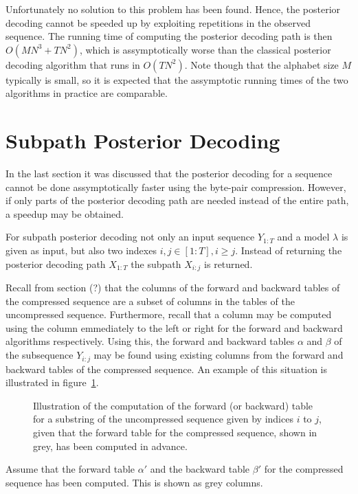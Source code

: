 Unfortunately no solution to this problem has been found. Hence, the posterior
decoding cannot be speeded up by exploiting repetitions in the observed
sequence. The running time of computing the posterior decoding path is then
$O(M N^3 + TN^2)$, which is assymptotically worse than the classical posterior
decoding algorithm that runs in $O(TN^2)$. Note though that the alphabet size
$M$ typically is small, so it is expected that the assymptotic running times of
the two algorithms in practice are comparable.

\section{Subpath Posterior Decoding}

In the last section it was discussed that the posterior decoding for a sequence
cannot be done assymptotically faster using the byte-pair compression. However,
if only parts of the posterior decoding path are needed instead of the entire
path, a speedup may be obtained.

For subpath posterior decoding not only an input sequence $Y_{1:T}$ and a
model $\lambda$ is given as input, but also two indexes $i,j \in
[1:T], i \ge j$. Instead of returning the posterior decoding path $X_{1:T}$ the
subpath $X_{i:j}$ is returned.

Recall from section (?) that the columns of the
forward and backward tables of the compressed sequence are a subset of columns
in the tables of the uncompressed sequence. Furthermore, recall that a column
may be computed using the column emmediately to the left or right for the
forward and backward algorithms respectively. Using this, the forward and
backward tables $\alpha$ and $\beta$ of the subsequence $Y_{i:j}$ may be found
using existing columns from the forward and backward tables of the compressed
sequence. An example of this situation is illustrated in
figure~\ref{fig:subsequence-posterior}.

\begin{figure}
  \centering
  
  \caption{Illustration of the computation of the forward (or backward) table
    for a substring of the uncompressed sequence given by indices $i$ to $j$,
    given that the forward table for the compressed sequence, shown in grey,
    has been computed in advance.}
  \label{fig:subsequence-posterior}
\end{figure}

Assume that the forward table $\alpha'$ and the backward table $\beta'$ for the
compressed sequence has been computed. This is shown as grey columns.

